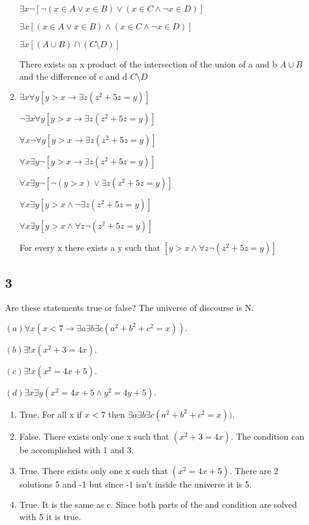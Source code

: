 \documentclass{article}
\begin{document}
\begin{enumerate}[label=(\alph*)]
    $\exists x \neg [\neg ( x \in A \lor x \in B) \lor (x \in C \land \neg x \in D)]$
    
    $\exists x [( x \in A \lor x \in B) \land (x \in C \land \neg x \in D)]$
    
    $\exists x [(A \cup B)\cap (C \setminus D)]$
    
    There exists an x product of the intersection of the union of a and b $A \cup B$ and the difference of c and d $C \setminus D$
    \item
    $\exists x\forall y[y > x \rightarrow \exists z(z^2+ 5z = y)]$
    
    $\neg \exists x\forall y[y > x \rightarrow \exists z(z^2+ 5z = y)]$
    
    $\forall x\neg \forall y[y > x \rightarrow \exists z(z^2+ 5z = y)]$
    
    $\forall x\exists y \neg [y > x \rightarrow \exists z(z^2+ 5z = y)]$
    
    $\forall x\exists y \neg [\neg (y > x) \lor \exists z(z^2+ 5z = y)]$
    
    $\forall x\exists y [y > x \land \neg \exists z(z^2+ 5z = y)]$
    
    $\forall x\exists y [y > x \land \forall z\neg (z^2+ 5z = y)]$
    
    For every x there exists a y such that $[y > x \land \forall z\neg (z^2+ 5z = y)]$
\end{enumerate}
\subsection{3}
Are these statements true or false? The universe of discourse is N.

$(a) \forall x(x < 7 \rightarrow \exists a \exists b \exists c(a^2+b^2+c^2 = x)).$

$(b) \exists! x(x^2+ 3 = 4x).$

$(c) \exists! x(x^2= 4x + 5).$

$(d) \exists x \exists y(x^2 = 4x + 5 \land y^2 = 4y + 5).$
\begin{enumerate}[label=(\alph*)]
    \item
    True. For all x if $x < 7 $ then $\exists a \exists b \exists c(a^2+b^2+c^2 = x))$. 
    \item
    False. There exists only one x such that $(x^2+ 3 = 4x)$. The condition can be accomplished with 1 and 3.
    \item
    True. There exists only one x such that $(x^2= 4x + 5)$. There are 2 solutions 5 and -1 but since -1 isn't inside the universe it is 5.
    \item
    True. It is the same as c. Since both parts of the and condition are solved with 5 it is true.
\end{enumerate}
\end{document}
